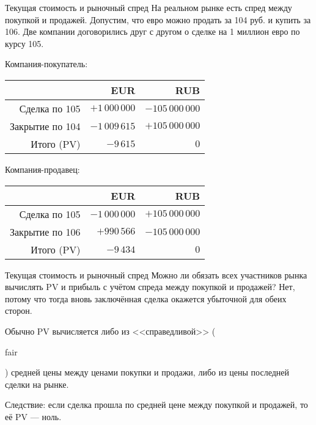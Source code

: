 \documentclass{beamer}
\newcommand{\en}[1]{\begin{otherlanguage}{english}#1\end{otherlanguage}}
\begin{document}
\begin{frame}{Текущая стоимость и рыночный спред}
\justify
На реальном рынке есть спред между покупкой и продажей. Допустим, что евро можно продать за 104 руб. и купить за 106. Две компании договорились друг с другом о сделке на 1 миллион евро по курсу 105.

\justify
Компания-покупатель:

\centering
\begin{tabular}{r|r|r}
                & EUR                   & RUB \\ \hline
Сделка по 105   & $+1\,000\,000$ & $-105\,000\,000$ \\
Закрытие по 104 & $-1\,009\,615$ & $+105\,000\,000$ \\ \hline
Итого (PV)      &      $-9\,615$ & $0$
\end{tabular}

\justify
Компания-продавец:

\centering
\begin{tabular}{r|r|r}
                 & EUR                   & RUB \\ \hline
Сделка по 105    & $-1\,000\,000$ & $+105\,000\,000$ \\
Закрытие по 106  &    $+990\,566$ & $-105\,000\,000$ \\ \hline
Итого (PV)       &      $-9\,434$ & $0$
\end{tabular} 
\end{frame}



\begin{frame}{Текущая стоимость и рыночный спред}
\justify
Можно ли обязать всех участников рынка вычислять PV и прибыль с учётом спреда между покупкой и продажей? Нет, потому что тогда вновь заключённая сделка окажется убыточной для обеих сторон.

\justify
Обычно PV вычисляется либо из <<справедливой>> (\en{fair}) средней цены между ценами покупки и продажи, либо из цены последней сделки на рынке. 

\justify
Следствие: если сделка прошла по средней цене между покупкой и продажей, то её PV --- ноль.
\end{frame}
\end{document}
